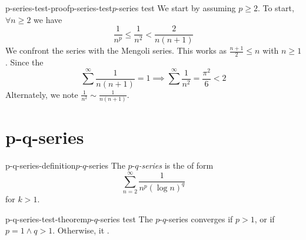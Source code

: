 \documentclass[preview]{standalone}
\begin{document}
\begin{snippetproof}{p-series-test-proof}{p-series-test}{\(p\)-series test}
    We start by assuming \(p \geq 2\).
    To start, \(\forall n \geq 2\) we have
    \[
        \frac{1}{n^p} \leq \frac{1}{n^2} < \frac{2}{n(n+1)}
    \]
    We confront the series with the Mengoli series.
    This works as \(\frac{n+1}{2} \leq n\) with \(n \geq 1\).
    Since the \series
    \[
        \sum^\infty \frac{1}{n(n+1)} = 1 \implies \sum^\infty \frac{1}{n^2} = \frac{\pi^2}{6} < 2
    \]
    Alternately, we note \(\frac{1}{n^2} \sim \frac{1}{n(n+1)}\).
    \todo
\end{snippetproof}

\section{p-q-series}

\begin{snippetdefinition}{p-q-series-definition}{\(p\text{-}q\)-series}
    The \emph{\(p\text{-}q\)-series} is the \series of form
    \[\sum_{n=2}^\infty \frac{1}{n^p{(\log n)}^q}\]
    for \(k > 1\).
\end{snippetdefinition}

\begin{snippettheorem}{p-q-series-test-theorem}{\(p\text{-}q\)-series test}
    The \(p\text{-}q\)-series converges if \(p > 1\), or if \(p=1 \land q>1\).
    Otherwise, it \seriesdiverges.
\end{snippettheorem}
\end{document}
